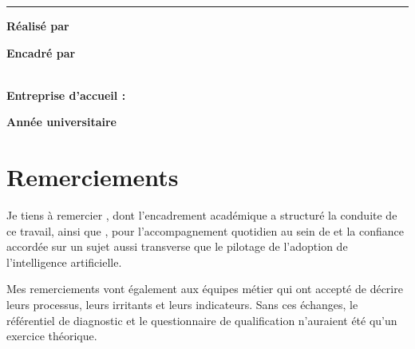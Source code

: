\begin{titlepage}
\begin{center}
  {\LARGE\bfseries\color{medicaDeep} \varTitre\par}

  \vspace{0.7cm}

  {\large\itshape\color{medicaMuted} \varSousTitre\par}

  \vspace{0.9cm}

  \rule{0.72\textwidth}{0.8pt}

  \vspace{2.1cm}

  \begin{minipage}{0.44\textwidth}
    \raggedright
    \textbf{Réalisé par}\\[4pt]
    \varAuteur
  \end{minipage}
  \hfill
  \begin{minipage}{0.44\textwidth}
    \raggedleft
    \textbf{Encadré par}\\[4pt]
    \varEncadrantAcademique\\
    \varEncadrantEntreprise
  \end{minipage}

  \vspace{1.5cm}

  \textbf{Entreprise d'accueil :} \varEntreprise

  \vfill

  {\color{white}\textbf{Année universitaire \varAnnee}}
  \vspace{0.35cm}
\end{center}
\end{titlepage}

\chapter*{Remerciements}

Je tiens à remercier \varEncadrantAcademique, dont l'encadrement académique a
structuré la conduite de ce travail, ainsi que \varEncadrantEntreprise, pour
l'accompagnement quotidien au sein de \varEntreprise{} et la confiance accordée sur un
sujet aussi transverse que le pilotage de l'adoption de l'intelligence artificielle.

Mes remerciements vont également aux équipes métier qui ont accepté de décrire leurs
processus, leurs irritants et leurs indicateurs. Sans ces échanges, le référentiel de
diagnostic et le questionnaire de qualification n'auraient été qu'un exercice
théorique.

